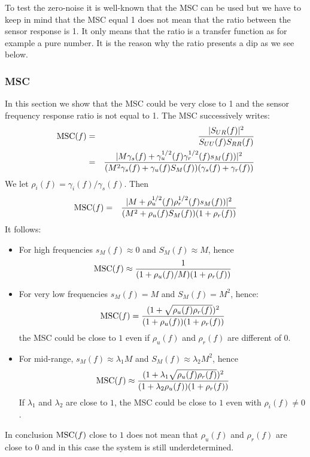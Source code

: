To test the zero-noise it is well-known that the MSC can be used but we have to keep in mind that the MSC equal 1 does not mean that the ratio between the sensor response is 1. It only means that the ratio is a transfer function as for example a pure number. It is the reason why the ratio presents a dip as we see below.

\subsubsection{MSC}
In this section we show that the MSC could be very close to 1 and the sensor frequency response ratio is not equal to 1. The MSC successively writes:
\begin{eqnarray}
\label{eq:RsuponM}
 \mathrm{MSC}(f) &=& \frac{|S_{UR}(f)|^2}{S_{UU}(f)S_{RR}(f)} \nonumber
 \\
 &=& \frac{|M\gamma_{s}(f)+\gamma_{u}^{1/2}(f)\gamma_{r}^{1/2}(f)s_M(f))|^2}
    {(M^2 \gamma_{s}(f)+ \gamma_{u}(f) S_M(f))(\gamma_{s}(f)+\gamma_{r}(f))}
\end{eqnarray}
We let $\rho_{i}(f)=\gamma_{i}(f)/\gamma_{s}(f)$. Then
\begin{eqnarray}
\label{eq:RsuponM-rho}
 \mathrm{MSC}(f) 
 &=& \frac{|M+\rho_{u}^{1/2}(f)\rho_{r}^{1/2}(f)s_M(f))|^2}
    {(M^2 + \rho_{u}(f) S_M(f))(1+\rho_{r}(f))}
\end{eqnarray}
It follows:
\begin{itemize}
 \item
For high frequencies $s_M(f)\approx 0$ and $S_M(f)\approx M$, hence 
\begin{eqnarray}
\label{eq:MSCHF}
 \mathrm{MSC}(f) 
 \approx \frac{1}{(1+\rho_{u}(f)/M)(1+\rho_{r}(f))}
\end{eqnarray}

 \item
For very low frequencies $s_M(f)= M$ and $S_M(f)= M^2$, hence:
\begin{eqnarray}
\label{eq:MSCBF}
 \mathrm{MSC}(f) = \frac{(1+\sqrt{\rho_{u}(f)\rho_{r}(f)})^{2}}{(1+\rho_{u}(f))(1+\rho_{r}(f))}
\end{eqnarray}
	the MSC could be close to $1$ even if $\rho_{u}(f)$ and $\rho_{r}(f)$ are different of 0.
 \item
For mid-range, $s_M(f)\approx \lambda_1 M$ and $S_M(f)\approx \lambda_2 M^{2}$, hence 
\begin{eqnarray}
\label{eq:MSCMidF}
 \mathrm{MSC}(f) \approx 
    \frac{(1+\lambda_{1}\sqrt{\rho_{u}(f)\rho_{r}(f)})^{2}}
           {(1+\lambda_{2} \rho_{u}(f))(1+\rho_{r}(f))}
\end{eqnarray}
If $\lambda_{1}$ and $\lambda_{2}$ are close to $1$, the MSC could be close to $1$ even with $\rho_{i}(f)\neq 0$.
\end{itemize}
In conclusion $\mathrm{MSC}(f)$ close to $1$ does not mean that  $\rho_{u}(f)$ and $\rho_{r}(f)$ are close to 0 and in this case the system is still underdetermined.



